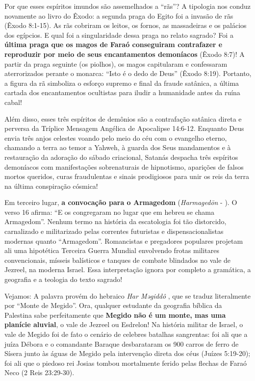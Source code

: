 Por que esses espíritos imundos são assemelhados a ``rãs''?
A tipologia nos conduz novamente ao livro do Êxodo: a segunda praga do Egito foi a invasão de rãs (Êxodo 8:1-15). As rãs cobriram os leitos, os fornos, as massadeiras e os palácios dos egípcios. E qual foi a singularidade dessa praga no relato sagrado? Foi a \textbf{última praga que os magos de Faraó conseguiram contrafazer e reproduzir por meio de seus encantamentos demoníacos} (Êxodo 8:7)! A partir da praga seguinte (os piolhos), os magos capitularam e confessaram aterrorizados perante o monarca: ``Isto é o dedo de Deus'' (Êxodo 8:19). Portanto, a figura da rã simboliza o esforço supremo e final da fraude satânica, a última cartada dos encantamentos ocultistas para iludir a humanidade antes da ruína cabal!

Além disso, esses três espíritos de demônios são a contrafação satânica direta e perversa da Tríplice Mensagem Angélica de Apocalipse 14:6-12. Enquanto Deus envia três anjos celestes voando pelo meio do céu com o evangelho eterno, chamando a terra ao temor a Yahweh, à guarda dos Seus mandamentos e à restauração da adoração do sábado criacional, Satanás despacha três espíritos demoníacos com manifestações sobrenaturais de hipnotismo, aparições de falsos mortos queridos, curas fraudulentas e sinais prodigiosos para unir os reis da terra na última conspiração cósmica!

Em terceiro lugar, \textbf{a convocação para o Armagedom} (\textit{Harmagedōn} - ).
O verso 16 afirma: ``E os congregaram no lugar que em hebreu se chama Armagedom''.
Nenhum termo na história da escatologia foi tão distorcido, carnalizado e militarizado pelas correntes futuristas e dispensacionalistas modernas quanto ``Armagedom''. Romancistas e pregadores populares projetam ali uma hipotética Terceira Guerra Mundial envolvendo frotas militares convencionais, mísseis balísticos e tanques de combate blindados no vale de Jezreel, na moderna Israel. Essa interpretação ignora por completo a gramática, a geografia e a teologia do texto sagrado!

Vejamos: A palavra provém do hebraico \textit{Har Məgiddô} , que se traduz literalmente por ``Monte de Megido''.
Ora, qualquer estudante da geografia bíblica da Palestina sabe perfeitamente que \textbf{Megido não é um monte, mas uma planície aluvial}, o vale de Jezreel ou Esdrelon! Na história militar de Israel, o vale de Megido foi de fato o cenário de celebres batalhas sangrentas: foi ali que a juíza Débora e o comandante Baraque desbarataram os 900 carros de ferro de Sísera junto às águas de Megido pela intervenção direta dos céus (Juízes 5:19-20); foi ali que o piedoso rei Josias tombou mortalmente ferido pelas flechas de Faraó Neco (2 Reis 23:29-30).

